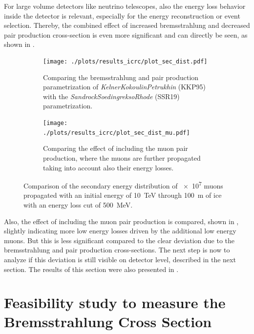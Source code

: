 For large volume detectors like neutrino telescopes, also the energy loss behavior inside the detector is relevant, especially for the energy reconstruction or event selection.
Thereby, the combined effect of increased bremsstrahlung and decreased pair production cross-section is even more significant and can directly be seen, as shown in .
\begin{figure}
    \centering
    \begin{subfigure}{0.47\textwidth}
        \centering
        \texttt{[image: ./plots/results\_icrc/plot\_sec\_dist.pdf]}
        \caption{Comparing the bremsstrahlung and pair production parametrization of \textit{KelnerKokoulinPetrukhin} (KKP95) with the \textit{SandrockSoedingreksoRhode} (SSR19) parametrization.}
        \label{fig:sec_dist_ssr_kkp}
    \end{subfigure}
    \hfill
    \begin{subfigure}{0.47\textwidth}
        \centering
        \texttt{[image: ./plots/results\_icrc/plot\_sec\_dist\_mu.pdf]}
        \caption{Comparing the effect of including the muon pair production, where the muons are further propagated taking into account also their energy losses.}
        \label{fig:sec_dist_mupair}
    \end{subfigure}
    \caption{Comparison of the secondary energy distribution of \num{e7} muons propagated with an initial energy of \SI{10}{TeV} through \SI{100}{m} of ice with an energy loss cut of \SI{500}{MeV}.}
    \label{fig:sec_dist_compare}
\end{figure}
Also, the effect of including the muon pair production is compared, shown in , slightly indicating more low energy losses driven by the additional low energy muons.
But this is less significant compared to the clear deviation due to the bremsstrahlung and pair production cross-sections.
The next step is now to analyze if this deviation is still visible on detector level, described in the next section.
The results of this section were also presented in \cite{Soedingrekso19ICRC}.

%

\section{Feasibility study to measure the Bremsstrahlung Cross Section} \label{sec:study}

